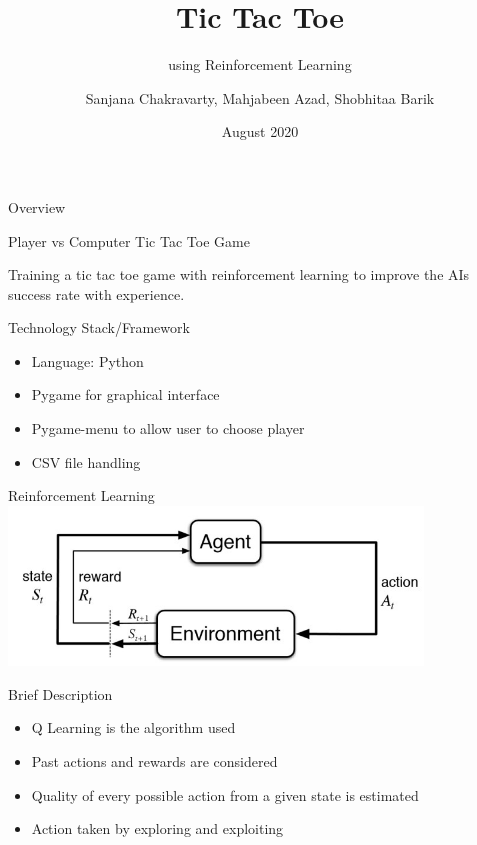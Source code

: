 \documentclass[14pt]{beamer}
\title[WTEF 2020]{Tic Tac Toe}
\subtitle{using Reinforcement Learning}
\author[Group 12]{Sanjana Chakravarty, Mahjabeen Azad, Shobhitaa Barik}
\date{August 2020}
\begin{document}
\begin{frame}
    \titlepage
\end{frame}

\begin{frame}{Overview}
    \begin{center}
        \textcolor{myAmber}{Player vs Computer Tic Tac Toe Game}
    \end{center}
   
    \begin{center}
    Training a tic tac toe game with reinforcement learning to improve the AI\textquotesingle s success rate with experience.
    \end{center}
\end{frame}

\begin{frame}{Technology Stack/Framework}
        \begin{itemize}
            \item Language: Python
            \item Pygame for graphical interface 
            \item Pygame-menu to allow user to choose player
            \item CSV file handling
        \end{itemize}
\end{frame}

\begin{frame}{Reinforcement Learning}
    \includegraphics[width=110mm]{RL.jpg}
\end{frame}

\begin{frame}{Brief Description}
        \begin{itemize}
            \item Q Learning is the algorithm used
            \item Past actions and rewards are considered
            \item Quality of every possible action from a given state is estimated
            \item Action taken by exploring and exploiting
        \end{itemize}
\end{frame}
\end{document}
